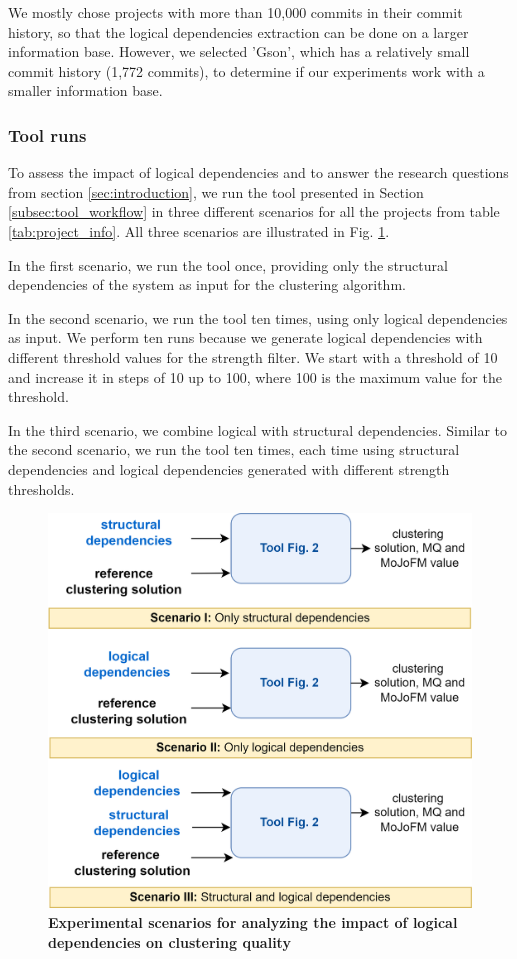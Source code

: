 \documentclass{ieeeaccess}
\begin{document}
We mostly chose projects with more than 10,000 commits in their commit history, so that the logical dependencies extraction can be done on a larger information base. However, we selected 'Gson', which has a relatively small commit history (1,772 commits), to determine if our experiments work with a smaller information base.

\subsubsection{Tool runs}

To assess the impact of logical dependencies and to answer the research questions from section \ref{sec:introduction}, we run the tool presented in Section \ref{subsec:tool_workflow} in three different scenarios for all the projects from table \ref{tab:project_info}. All three scenarios are illustrated in Fig. \ref{fig:scenatrio}.

In the first scenario, we run the tool once, providing only the structural dependencies of the system as input for the clustering algorithm.

In the second scenario, we run the tool ten times, using only logical dependencies as input. We perform ten runs because we generate logical dependencies with different threshold values for the strength filter. We start with a threshold of 10 and increase it in steps of 10 up to 100, where 100 is the maximum value for the threshold.

In the third scenario, we combine logical with structural dependencies. Similar to the second scenario, we run the tool ten times, each time using structural dependencies and logical dependencies generated with different strength thresholds.

\begin{figure}[t!]
  \centering
  \includegraphics[width=\columnwidth]{scenario.png}
  \caption{ \textbf{Experimental scenarios for analyzing the impact of logical dependencies on clustering quality}}
  \label{fig:scenatrio}
\end{figure}
\end{document}

